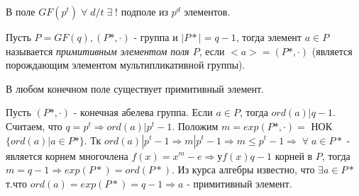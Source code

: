 \begin{sledsv}
  В поле $GF(p^t)\; \forall\; d/t\; \exists\;!$ подполе из $p^d$ элементов.
\end{sledsv}

\begin{defs}
  Пусть $P = GF(q), (P*, \cdot)$ - группа и $|P*| = q-1$, тогда элемент $a \in P$ называется \textit{примитивным элементом поля $P$}, если $<a> = (P*, \cdot)$ (является порождающим элементом мультипликативной группы).
\end{defs}

\begin{proofs}
	В любом конечном поле существует примитивный элемент.

  \begin{dokvo}
    Пусть $(P*, \cdot)$ -  конечная абелева группа. Если $a \in P$, тогда $ord(a) | q-1$. Считаем, что $q = p^t \Rightarrow ord(a) | p^t - 1$. Положим $m = exp(P*, \cdot) =$ 
    НОК$\{ord(a) |a \in P*\}$. Тк $ord(a) | p^t - 1 \Rightarrow m | p^t - 1 \Rightarrow m \leq p^t - 1 \Rightarrow\; \forall\; a \in P*$ - является корнем
    многочлена $f(x) = x^m - e \Rightarrow у f(x) q-1$ корней в $P$, тогда $m = q - 1 \Rightarrow exp(P*) = ord(P*)$. Из курса алгебры известно, что
    $\exists a \in P*$ т.что $ord(a) = exp(P*) = q - 1 \Rightarrow a$ - примитивный элемент.

	\end{dokvo}
\end{proofs}

\newpage
